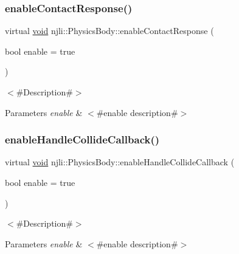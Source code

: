\subsubsection{\texorpdfstring{enable\+Contact\+Response()}{enableContactResponse()}}
{\footnotesize\ttfamily virtual \mbox{\hyperlink{_thread_8h_af1e856da2e658414cb2456cb6f7ebc66}{void}} njli\+::\+Physics\+Body\+::enable\+Contact\+Response (\begin{DoxyParamCaption}\item[{bool}]{enable = {\ttfamily true} }\end{DoxyParamCaption})\hspace{0.3cm}{\ttfamily [virtual]}}

$<$\#\+Description\#$>$


\begin{DoxyParams}{Parameters}
{\em enable} & $<$\#enable description\#$>$ \\
\hline
\end{DoxyParams}
\mbox{\label{classnjli_1_1_physics_body_a52eca1531519fbd9a3612e36fd797208}} 
\subsubsection{\texorpdfstring{enable\+Handle\+Collide\+Callback()}{enableHandleCollideCallback()}}
{\footnotesize\ttfamily virtual \mbox{\hyperlink{_thread_8h_af1e856da2e658414cb2456cb6f7ebc66}{void}} njli\+::\+Physics\+Body\+::enable\+Handle\+Collide\+Callback (\begin{DoxyParamCaption}\item[{bool}]{enable = {\ttfamily true} }\end{DoxyParamCaption})\hspace{0.3cm}{\ttfamily [virtual]}}

$<$\#\+Description\#$>$


\begin{DoxyParams}{Parameters}
{\em enable} & $<$\#enable description\#$>$ \\
\hline
\end{DoxyParams}
\mbox{\label{classnjli_1_1_physics_body_a03e2635ad02016962cee7df3019e73eb}} 
